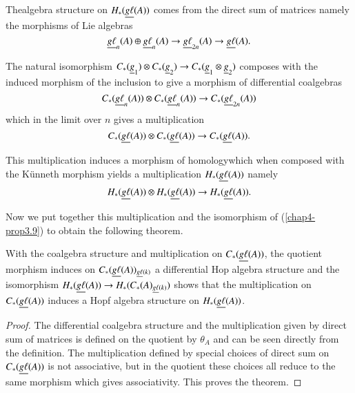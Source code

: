 The\pageoriginale algebra structure on $H_{\ast}(\underline{g\ell}(A))$ comes from the
direct sum of matrices namely the morphisms of Lie algebras
$$
\underline{g\ell}_{n}(A)\oplus \underline{g\ell}_{n}(A)\to \underline{g\ell}_{2n}(A)\to
\underline{g\ell}(A). 
$$

The natural isomorphism $C_{\ast}(\underline{g}_{1})\otimes
C_{\ast}(\underline{g}_{2})\to C_{\ast}(\underline{g}_{1}\otimes \underline{g}_{2})$
composes with the induced morphism of the inclusion to give a morphism
of differential coalgebras
$$
C_{\ast}(\underline{g\ell}_{n}(A))\otimes C_{\ast}(\underline{g\ell}_{n}(A))\to
C_{\ast}(\underline{g\ell}_{2n}(A)) 
$$
which in the limit over $n$ gives a multiplication
$$
C_{\ast}(\underline{g\ell}(A))\otimes C_{\ast}(\underline{g\ell}(A))\to
C_{\ast}(\underline{g\ell}(A)). 
$$

\begin{remark}\label{chap4-rem4.1}
This multiplication induces a morphism of homology\break which when composed
with the K\"unneth morphism yields a multiplication
$H_{\ast}(\underline{g\ell}(A))$ namely
$$
H_{\ast}(\underline{g\ell}(A))\otimes H_{\ast}(\underline{g\ell}(A))\to
H_{\ast}(\underline{g\ell}(A)). 
$$
\end{remark}

Now we put together this multiplication and the isomorphism of 
(\ref{chap4-prop3.9}) to obtain the following theorem.

\begin{theorem}\label{chap4-thm4.2}
With the coalgebra structure and multiplication on
$C_{\ast}\break(\ul{g\ell}(A))$, the quotient morphism induces on
$C_{\ast}(\underline{g\ell}(A))_{\underline{g\ell}(k)}$ a differential Hop algebra
structure and the isomorphism $H_{\ast}(\ul{g\ell}(A))\to
H_{\ast}(C_{\ast}\break(A)_{\ul{g\ell}(k)})$ shows that the multiplication
on $C_{\ast}(\underline{g\ell}(A))$ induces a Hopf algebra structure on
$H_{\ast}(\underline{g\ell}(A))$. 
\end{theorem}


\begin{proof}
The differential coalgebra structure and the multiplication given by
direct sum of matrices is defined on the quotient by $\theta_{A}$ and
can be seen directly from the definition. The multiplication defined
by special choices of direct sum on $C_{\ast}(\underline{g\ell}(A))$ is not
associative, but in the quotient these choices all reduce to the same
morphism which gives associativity. This proves the theorem. 
\end{proof}

